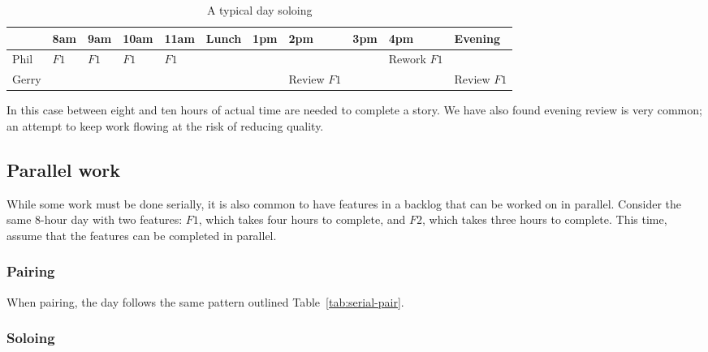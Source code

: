 \documentclass[letterpaper]{article}
\theoremstyle{definition}
\begin{document}
    \begin{table}[h]
        \centering
        \tiny
        \begin{tabular}{ |l|l|l|l|l|l|l|l|l|l|l| }
            \hline
            & 8am                     & 9am                     & 10am                    & 11am                    & Lunch & 1pm & 2pm                            & 3pm & 4pm                            & Evening                        \\
            \hline
            Phil  & \cellcolor{blue!10}$F1$ & \cellcolor{blue!10}$F1$ & \cellcolor{blue!10}$F1$ & \cellcolor{blue!10}$F1$ &       &     &        &     & \cellcolor{blue!10}Rework $F1$ &         \\
            \hline
            Gerry &                         &                         &                         &                         &       &     & \cellcolor{blue!10}Review $F1$ &     &                                & \cellcolor{blue!10}Review $F1$ \\
            \hline
        \end{tabular}
        \caption{A typical day soloing}
        \label{tab:serial-solo-realistic}
    \end{table}

    In this case between eight and ten hours of actual time are needed to complete a story.
    We have also found evening review is very common;
    an attempt to keep work flowing at the risk of reducing quality.

    \subsection{Parallel work}\label{subsec:parallel-work}

    While some work must be done serially, it is also common to have features in a backlog that can be worked on in
    parallel.
    Consider the same 8-hour day with two features: $F1$, which takes four hours to complete, and
    $F2$, which takes three hours to complete.
    This time, assume that the features can be completed in parallel.

    \subsubsection{Pairing}\label{subsubsec:parallel-pairing}

    When pairing, the day follows the same pattern outlined Table~\ref{tab:serial-pair}.

    \subsubsection{Soloing}\label{subsubsec:parallel-soloing}
\end{document}
